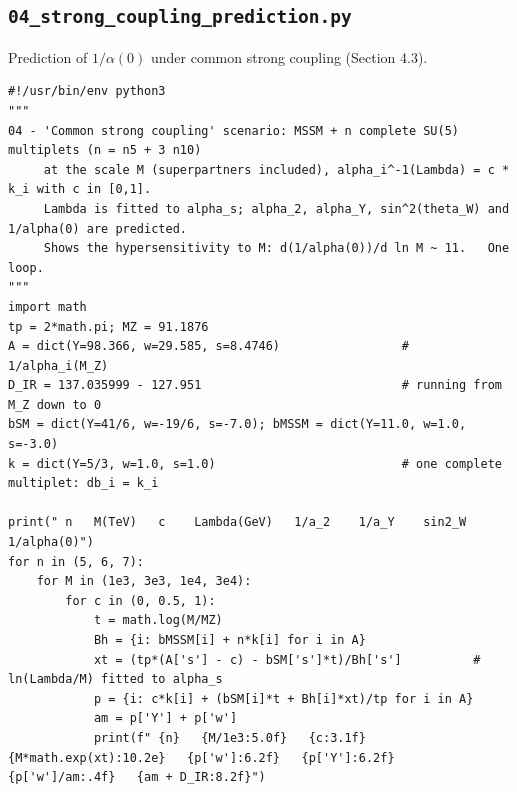\documentclass[11pt,a4paper]{article}
\begin{document}
\subsection{\texttt{04\_strong\_coupling\_prediction.py}}
Prediction of $1/\alpha(0)$ under common strong coupling (Section 4.3).
\begin{lstlisting}
#!/usr/bin/env python3
"""
04 - 'Common strong coupling' scenario: MSSM + n complete SU(5) multiplets (n = n5 + 3 n10)
     at the scale M (superpartners included), alpha_i^-1(Lambda) = c * k_i with c in [0,1].
     Lambda is fitted to alpha_s; alpha_2, alpha_Y, sin^2(theta_W) and 1/alpha(0) are predicted.
     Shows the hypersensitivity to M: d(1/alpha(0))/d ln M ~ 11.   One loop.
"""
import math
tp = 2*math.pi; MZ = 91.1876
A = dict(Y=98.366, w=29.585, s=8.4746)                 # 1/alpha_i(M_Z)
D_IR = 137.035999 - 127.951                            # running from M_Z down to 0
bSM = dict(Y=41/6, w=-19/6, s=-7.0); bMSSM = dict(Y=11.0, w=1.0, s=-3.0)
k = dict(Y=5/3, w=1.0, s=1.0)                          # one complete multiplet: db_i = k_i

print(" n   M(TeV)   c    Lambda(GeV)   1/a_2    1/a_Y    sin2_W   1/alpha(0)")
for n in (5, 6, 7):
    for M in (1e3, 3e3, 1e4, 3e4):
        for c in (0, 0.5, 1):
            t = math.log(M/MZ)
            Bh = {i: bMSSM[i] + n*k[i] for i in A}
            xt = (tp*(A['s'] - c) - bSM['s']*t)/Bh['s']          # ln(Lambda/M) fitted to alpha_s
            p = {i: c*k[i] + (bSM[i]*t + Bh[i]*xt)/tp for i in A}
            am = p['Y'] + p['w']
            print(f" {n}   {M/1e3:5.0f}   {c:3.1f}   {M*math.exp(xt):10.2e}   {p['w']:6.2f}   {p['Y']:6.2f}   {p['w']/am:.4f}   {am + D_IR:8.2f}")
\end{lstlisting}
\end{document}

